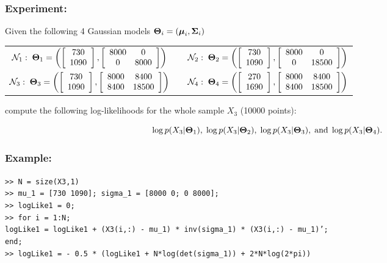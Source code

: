 \documentclass[a4paper]{article}
\newcommand{\mat}[1]{{\tt >> #1} \\}
\newcommand{\com}[1]{{\tt #1}}
\newcommand{\muv}{\ensuremath\boldsymbol{\mu}}  %
\newcommand{\Sm}{\ensuremath\boldsymbol{\Sigma}}  %
\newcommand{\Tm}{\ensuremath\boldsymbol{\Theta}}  %
\begin{document}
\subsubsection{Experiment:}
Given the following 4 Gaussian models $\Tm_i = (\muv_i,\Sm_i)$
\begin{center}
\begin{tabular}{ccc}
${\cal N}_1: \; \Tm_1 = \left(
\left[\begin{array}{c}730 \\ 1090\end{array}\right],
\left[\begin{array}{cc}8000 & 0 \\ 0 & 8000\end{array}\right]
\right)$ & \hspace{2cm} &
${\cal N}_2: \; \Tm_2 = \left(
\left[\begin{array}{c}730 \\ 1090\end{array}\right],
\left[\begin{array}{cc}8000 & 0 \\ 0 & 18500\end{array}\right]
\right)$ \\[2em]
${\cal N}_3: \; \Tm_3 = \left(
\left[\begin{array}{c}730 \\ 1090\end{array}\right],
\left[\begin{array}{cc}8000 & 8400 \\ 8400 & 18500\end{array}\right]
\right)$ & \hspace{2cm} &
${\cal N}_4: \; \Tm_4 = \left(
\left[\begin{array}{c}270 \\ 1690\end{array}\right],
\left[\begin{array}{cc}8000 & 8400 \\ 8400 & 18500\end{array}\right]
\right)$
\end{tabular}
\end{center}
\vspace{0.5em} compute the following {log-likelihoods} for the whole sample
$X_3$ (10000 points):


\[
\log p(X_3|\Tm_1),\; \log p(X_3|\Tm_2),\; \log p(X_3|\Tm_3),\;
\text{and}\; \log p(X_3|\Tm_4).
\]

\subsubsection{Example:}
\mat{N = size(X3,1)}
\mat{mu\_1 = [730 1090]; sigma\_1 = [8000 0; 0 8000];}
\mat{logLike1 = 0;}
\mat{for i = 1:N;}
\com{logLike1 = logLike1 + (X3(i,:) - mu\_1) * inv(sigma\_1) * (X3(i,:) - mu\_1)';} \\
\com{end;} \\
\mat{logLike1 =  - 0.5 * (logLike1 + N*log(det(sigma\_1)) + 2*N*log(2*pi))}
\end{document}
